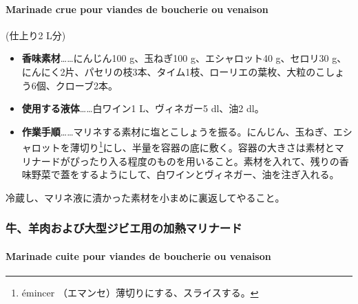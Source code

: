 \begin{recette}
{\paragraph{Marinade crue pour viandes de boucherie ou
venaison}\label{marinade-crue-pour-viandes-de-boucherie-ou-venaison}}


(仕上り2 L分)

\begin{itemize}
\item
  \textbf{香味素材}\ldots{}\ldots{}にんじん100 g、玉ねぎ100
  g、エシャロット40 g、セロリ30
  g、にんにく2片、パセリの枝3本、タイム1枝、ローリエの葉\undemi{}枚、大粒のこしょう6個、クローブ2本。
\item
  \textbf{使用する液体}\ldots{}\ldots{}白ワイン1\unquart{}
  L、ヴィネガー5 dl、油2\undemi{} dl。
\item
  \textbf{作業手順}\ldots{}\ldots{}マリネする素材に塩とこしょうを振る。にんじん、玉ねぎ、エシャロットを薄切り\footnote{émincer
    （エマンセ）薄切りにする、スライスする。}にし、半量を容器の底に敷く。容器の大きさは素材とマリナードがぴったり入る程度のものを用いること。素材を入れて、残りの香味野菜で蓋をするようにして、白ワインとヴィネガー、油を注ぎ入れる。
\end{itemize}

冷蔵し、マリネ液に漬かった素材を小まめに裏返してやること。

\maeaki

\hypertarget{ushi-hitsuji-oogatajibie-youno-kanetsu-marinade}{%
\subsubsection{牛、羊肉および大型ジビエ用の加熱マリナード}\label{ushi-hitsuji-oogatajibie-youno-kanetsu-marinade}}

\hypertarget{marinade-cuite-pour-viandes-de-boucherie-ou-venaison}{%
\paragraph{Marinade cuite pour viandes de boucherie ou
venaison}\label{marinade-cuite-pour-viandes-de-boucherie-ou-venaison}}



\end{recette}
